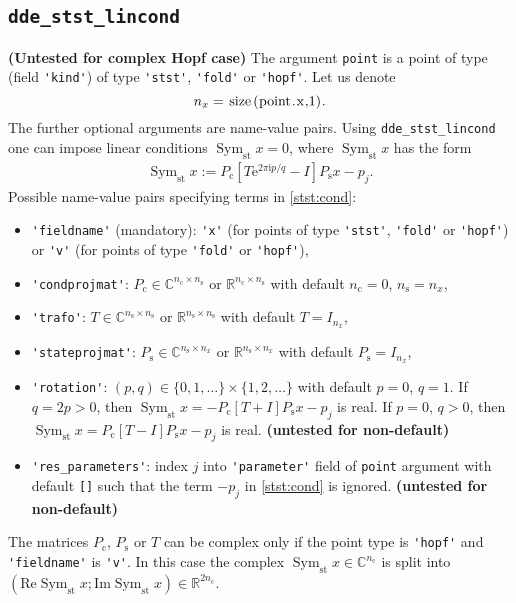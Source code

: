 \documentclass[11pt]{scrartcl}
\newcommand{\mt}[1]{\mathrm{#1}}
\renewcommand{\i}{\mt{i}}
\providecommand{\e}{\mt{e}}
\newcommand{\re}{\mt{Re}}
\newcommand{\im}{\mt{Im}}
\newcommand{\nc}{n_\mt{c}}
\newcommand{\ns}{n_\mt{s}}
\newcommand{\Pc}{P_\mt{c}}
\newcommand{\Ps}{P_\mt{s}}
\newcommand{\R}{\mathbb{R}}
\newcommand{\C}{\mathbb{C}}
\DeclareMathOperator{\sym}{Sym}
\newcommand{\symst}{\sym_\mathrm{st}}
\newcommand{\warn}[1]{\textbf{\color{red}(#1)}}
\newcommand{\blist}[1]{\mbox{\lstinline!#1!}}  \newlength{\tabw}
\begin{document}
\subsection{\blist{dde_stst_lincond}}
\label{sec:stst}
\warn{Untested for complex Hopf case} The argument
\blist{point} is a point of type (field \blist{'kind'}) of type
\blist{'stst'}, \blist{'fold'} or \blist{'hopf'}. Let us denote
\begin{displaymath}
  n_x=\blist{size(point.x,1)}.
\end{displaymath}
The further optional
arguments are name-value pairs. Using \blist{dde_stst_lincond} one can
impose linear conditions $\symst x=0$, where $\symst x$ has the form
\begin{align}
  \label{stst:cond}
  \symst x:=\Pc\left[T\e^{\textstyle 2\pi\i p/q}-I\right]\Ps x-p_j.
\end{align}
Possible name-value pairs specifying terms in \eqref{stst:cond}:
\begin{itemize}
\item \blist{'fieldname'} (mandatory): \blist{'x'} (for points of type \blist{'stst'}, \blist{'fold'} or \blist{'hopf'}) or \blist{'v'} (for
points of type \blist{'fold'} or \blist{'hopf'}),
\item \blist{'condprojmat'}: $\Pc\in\C^{\nc\times \ns}$ or
  $\R^{\nc\times \ns}$ with default $\nc=0$, $\ns=n_x$,
\item \blist{'trafo'}: $T\in\C^{\ns\times\ns}$ or $\R^{\ns\times\ns}$ with default $T=I_{n_x}$,
\item \blist{'stateprojmat'}: $\Ps\in\C^{\ns\times n_x}$ or $\R^{\ns\times n_x}$ with default $\Ps=I_{n_x}$,
\item \blist{'rotation'}: $(p,q)\in\{0,1,\ldots\}\times\{1,2,\ldots\}$
  with default $p=0$, $q=1$. If $q=2p>0$, then $\symst x=-\Pc[T+I]\Ps x-p_j$
  is real. If $p=0$, $q>0$, then $\symst x=\Pc[T-I]\Ps x-p_j$ is real. \warn{untested for non-default}
\item \blist{'res_parameters'}: index $j$ into  \blist{'parameter'} field of \blist{point} argument with default \blist{[]} such that the term $-p_j$ in \eqref{stst:cond} is ignored. \warn{untested for non-default}
\end{itemize}
The matrices $\Pc$, $\Ps$ or $T$ can be complex only if the point type
is \blist{'hopf'} and \blist{'fieldname'} is \blist{'v'}. In this case
the complex $\symst x\in\C^{\nc}$ is split into
$(\re\symst x;\im\symst x)\in\R^{2\nc}$.
\end{document}
